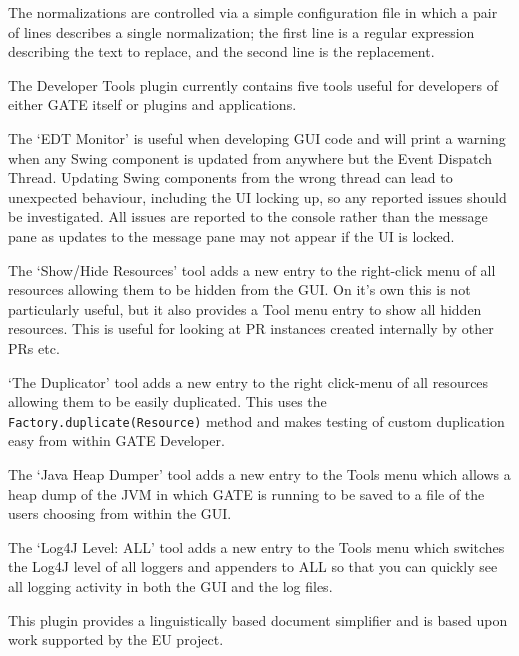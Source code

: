 The normalizations are controlled via a simple configuration file in which
a pair of lines describes a single normalization; the first line is a regular
expression describing the text to replace, and the second line is the
replacement.

%
%
The Developer Tools plugin currently contains five tools useful for developers
of either GATE itself or plugins and applications.

The `EDT Monitor' is useful when developing GUI code and will print a warning
when any Swing component is updated from anywhere but the Event Dispatch
Thread. Updating Swing components from the wrong thread can lead to unexpected
behaviour, including the UI locking up, so any reported issues should be
investigated. All issues are reported to the console rather than the message
pane as updates to the message pane may not appear if the UI is locked.

The `Show/Hide Resources' tool adds a new entry to the right-click menu of
all resources allowing them to be hidden from the GUI. On it's own this is
not particularly useful, but it also provides a Tool menu entry to show
all hidden resources. This is useful for looking at PR instances created
internally by other PRs etc.

`The Duplicator' tool adds a new entry to the right click-menu of all resources
allowing them to be easily duplicated. This uses the
\verb|Factory.duplicate(Resource)| method and makes testing of custom duplication
easy from within GATE Developer.

The `Java Heap Dumper' tool adds a new entry to the Tools menu which allows a heap dump
of the JVM in which GATE is running to be saved to a file of the users choosing
from within the GUI.

The `Log4J Level: ALL' tool adds a new entry to the Tools menu which switches the
Log4J level of all loggers and appenders to ALL so that you can quickly see all
logging activity in both the GUI and the log files.

%
%
This plugin provides a linguistically based document simplifier and is based
upon work supported by the EU 
project.


